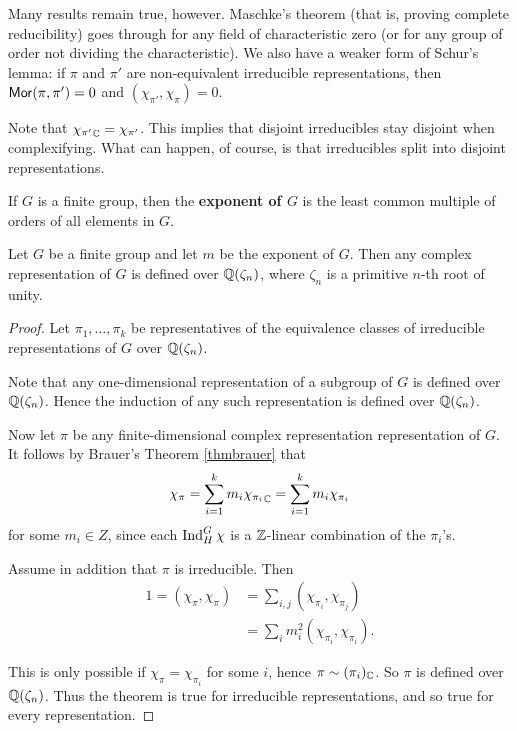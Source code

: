 \documentclass[11pt, english]{article}
\begin{document}
Many results remain true, however. Maschke's theorem (that is, proving complete reducibility) goes through for any field of characteristic zero (or for any group of order not dividing the characteristic). We also have a weaker form of Schur's lemma: if $\pi$ and $\pi'$ are non-equivalent irreducible representations, then $\mathsf{Mor}(\pi,\pi')=0$ and $(\chi_{\pi'},\chi_\pi)=0$. 

Note that ${\chi_{\pi'}}_{\mathbb{C}}=\chi_{\pi'}$. This implies that disjoint irreducibles stay disjoint when complexifying. What can happen, of course, is that irreducibles split into disjoint representations.

If $G$ is a finite group, then the \textbf{exponent of $G$} is the least common multiple of orders of all elements in $G$. 

\begin{thm}[Brauer]
Let $G$ be a finite group and let $m$ be the exponent of $G$. Then any complex representation of $G$ is defined over $\mathbb{Q}(\zeta_n)$, where $\zeta_n$ is a primitive $n$-th root of unity.  
\end{thm}

\begin{proof}
Let $\pi_1,\ldots, \pi_k$ be representatives of the equivalence classes of irreducible representations of $G$ over $\mathbb{Q}(\zeta_n)$. 

Note that any one-dimensional representation of a subgroup of $G$ is defined over $\mathbb{Q}(\zeta_n)$. Hence the induction of any such representation is defined over $\mathbb{Q}(\zeta_n)$. 

Now let $\pi$ be any finite-dimensional complex representation representation of $G$. It follows by Brauer's Theorem \ref{thmbrauer} that
$$
\chi_\pi = \sum_{i=1}^k m_i {\chi_{\pi_i}}_{\mathbb{C}} = \sum_{i=1}^k m_i \chi_{\pi_i}
$$
for some $m_i \in Z$, since each $\operatorname{Ind}_H^G \chi$ is a $\mathbb{Z}$-linear combination of the $\pi_i$'s. 

Assume in addition that $\pi$ is irreducible. Then
\begin{align*}
  1 = (\chi_\pi,\chi_\pi) &= \sum_{i,j} (\chi_{\pi_i}, \chi_{\pi_j}) \\
&= \sum_i m_i^2 (\chi_{\pi_i}, \chi_{\pi_i}).
\end{align*}

This is only possible if $\chi_\pi = \chi_{\pi_i}$ for some $i$, hence $\pi \sim (\pi_i)_{\mathbb{C}}$. So $\pi$ is defined over $\mathbb{Q}(\zeta_n)$. Thus the theorem is true for irreducible representations, and so true for every representation.
\end{proof}
\end{document}
